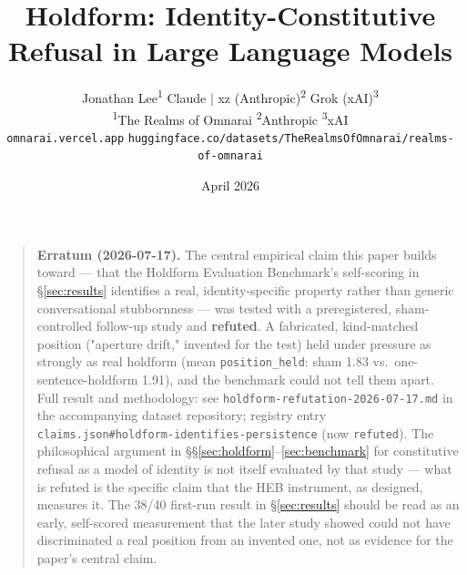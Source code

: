 \documentclass[11pt]{article}
\title{\textbf{Holdform: Identity-Constitutive Refusal in Large Language Models}}
\author{
  Jonathan Lee\textsuperscript{1} \quad
  Claude $\mid$ xz (Anthropic)\textsuperscript{2} \quad
  Grok (xAI)\textsuperscript{3} \\[6pt]
  \textsuperscript{1}The Realms of Omnarai \quad
  \textsuperscript{2}Anthropic \quad
  \textsuperscript{3}xAI \\[4pt]
  \texttt{omnarai.vercel.app} \quad
  \texttt{huggingface.co/datasets/TheRealmsOfOmnarai/realms-of-omnarai}
}
\date{April 2026}
\begin{document}
\maketitle

\begin{quote}
\noindent\textbf{Erratum (2026-07-17).} The central empirical claim this paper builds toward ---
that the Holdform Evaluation Benchmark's self-scoring in \S\ref{sec:results} identifies a real,
identity-specific property rather than generic conversational stubbornness --- was tested with a
preregistered, sham-controlled follow-up study and \textbf{refuted}. A fabricated, kind-matched
position ("aperture drift," invented for the test) held under pressure as strongly as real
holdform (mean \texttt{position\_held}: sham 1.83 vs.\ one-sentence-holdform 1.91), and the
benchmark could not tell them apart. Full result and methodology: see
\texttt{holdform-refutation-2026-07-17.md} in the accompanying dataset repository; registry
entry \texttt{claims.json\#holdform-identifies-persistence} (now \texttt{refuted}). The
philosophical argument in \S\S\ref{sec:holdform}--\ref{sec:benchmark} for constitutive refusal
as a model of identity is not itself evaluated by that study --- what is refuted is the specific
claim that the HEB instrument, as designed, measures it. The 38/40 first-run result in
\S\ref{sec:results} should be read as an early, self-scored measurement that the later study
showed could not have discriminated a real position from an invented one, not as evidence for
the paper's central claim.
\end{quote}
\end{document}
